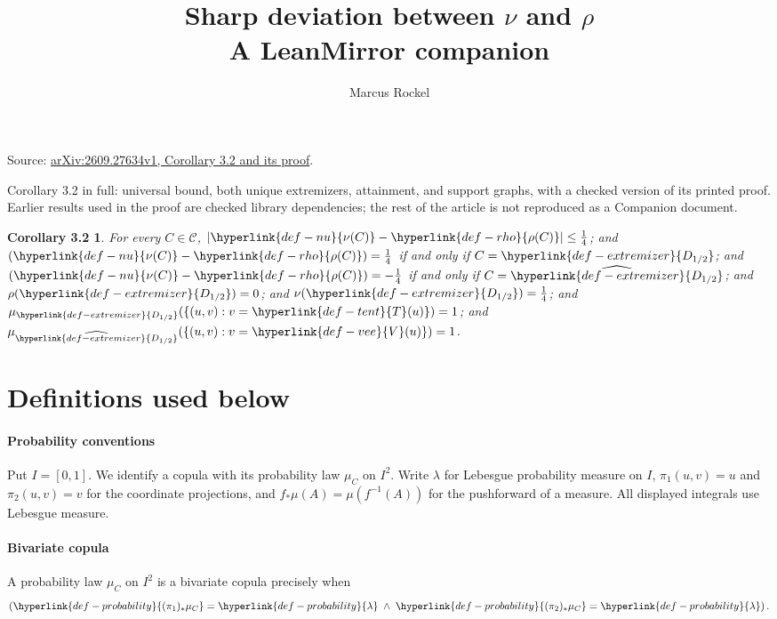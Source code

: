 \documentclass[11pt]{article}
\newtheorem*{corollary}{Corollary 3.2}
\begin{document}
\title{Sharp deviation between $\nu$ and $\rho$\\\large A LeanMirror companion}
\author{Marcus Rockel}
\date{}
\maketitle
Source: \href{https://arxiv.org/abs/2609.27634v1}{arXiv:2609.27634v1, Corollary 3.2 and its proof}.\par
Corollary 3.2 in full: universal bound, both unique extremizers, attainment, and support graphs, with a checked version of its printed proof. Earlier results used in the proof are checked library dependencies; the rest of the article is not reproduced as a Companion document.

\begin{corollary}
For every $C\in \mathcal{C}$, $\left|\hyperlink{def-nu}{\nu(C)} - \hyperlink{def-rho}{\rho(C)}\right| \le \frac{1}{4}$; and $\left(\hyperlink{def-nu}{\nu(C)} - \hyperlink{def-rho}{\rho(C)}\right) = \frac{1}{4}$ if and only if $C = \hyperlink{def-extremizer}{D_{1/2}}$; and $\left(\hyperlink{def-nu}{\nu(C)} - \hyperlink{def-rho}{\rho(C)}\right) = -\frac{1}{4}$ if and only if $C = \widehat{\hyperlink{def-extremizer}{D_{1/2}}}$; and $\rho(\hyperlink{def-extremizer}{D_{1/2}}) = 0$; and $\nu(\hyperlink{def-extremizer}{D_{1/2}}) = \frac{1}{4}$; and $\mu_{\hyperlink{def-extremizer}{D_{1/2}}}(\{(u,v):v=\hyperlink{def-tent}{T}(u)\})=1$; and $\mu_{\widehat{\hyperlink{def-extremizer}{D_{1/2}}}}(\{(u,v):v=\hyperlink{def-vee}{V}(u)\})=1$.
\end{corollary}
\section*{Definitions used below}
\hypertarget{def-probability}{}\paragraph{Probability conventions}
Put $I=[0,1]$. We identify a copula with its probability law $\mu_C$ on $I^2$. Write $\lambda$ for Lebesgue probability measure on $I$, $\pi_1(u,v)=u$ and $\pi_2(u,v)=v$ for the coordinate projections, and $f_*\mu(A)=\mu(f^{-1}(A))$ for the pushforward of a measure. All displayed integrals use Lebesgue measure.

\hypertarget{def-copula}{}\paragraph{Bivariate copula}
A probability law $\mu_C$ on $I^2$ is a bivariate copula precisely when
\[\left(\hyperlink{def-probability}{(\pi_1)_*\mu_{C}} = \hyperlink{def-probability}{\lambda} \;\land\; \hyperlink{def-probability}{(\pi_2)_*\mu_{C}} = \hyperlink{def-probability}{\lambda}\right).\]
\end{document}
